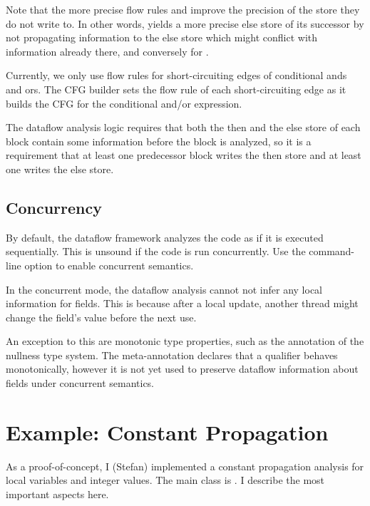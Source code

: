 Note that the more precise flow rules  and 
improve the precision of the store they do not write to.  In other words, 
yields a more precise else store of its successor by not propagating information to the else store which might conflict with information already there, and conversely for .

Currently, we only use flow rules for short-circuiting edges of conditional ands and ors.  The CFG builder sets the flow rule of each short-circuiting edge as it builds the CFG for the conditional and/or expression. 

The dataflow analysis logic requires that both the then and the else store of each block contain some information before the block is analyzed, so it is a requirement that at least one predecessor block writes the then store and at least one writes the else store.


\subsection{Concurrency}

By default, the dataflow framework analyzes the code as if it is 
executed sequentially.
This is unsound if the code is run concurrently.  Use the
command-line option to enable concurrent semantics.

In the concurrent mode, the dataflow analysis cannot not infer any local
information for fields.  This is because after a local update, another
thread might change the field's value before the next use.

An exception to this are monotonic type properties, such as the  annotation
of the nullness type system.  The meta-annotation  declares that a qualifier behaves monotonically, however it is not yet used to
preserve dataflow information about fields under concurrent semantics.


\section{Example: Constant Propagation}

    As a proof-of-concept, I (Stefan) implemented a constant propagation analysis for local variables
    and integer values.  The main class is 
    . 
    I describe the most important aspects here.
    
